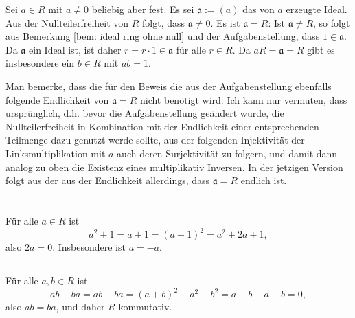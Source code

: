 \documentclass[a4paper,10pt]{article}
\theoremstyle{definition}
\newcommand{\mf}[1]{\mathfrak{#1}}
\begin{document}
Sei $a \in R$ mit $a \neq 0$ beliebig aber fest. Es sei $\mf{a} := (a)$ das von $a$ erzeugte Ideal. Aus der Nullteilerfreiheit von $R$ folgt, dass $\mf{a} \neq 0$. Es ist $\mf{a} = R$: Ist $\mf{a} \neq R$, so folgt aus Bemerkung \ref{bem: ideal ring ohne null} und der Aufgabenstellung, dass $1 \in \mf{a}$. Da $\mf{a}$ ein Ideal ist, ist daher $r = r \cdot 1 \in \mf{a}$ für alle $r \in R$. Da $aR = \mf{a} = R$ gibt es insbesondere ein $b \in R$ mit $ab = 1$.

Man bemerke, dass die für den Beweis die aus der Aufgabenstellung ebenfalls folgende Endlichkeit von $\mf{a} = R$ nicht benötigt wird: Ich kann nur vermuten, dass ursprünglich, d.h. bevor die Aufgabenstellung geändert wurde, die Nullteilerfreiheit in Kombination mit der Endlichkeit einer entsprechenden Teilmenge dazu genutzt werde sollte, aus der folgenden Injektivität der Linksmultiplikation mit $a$ auch deren Surjektivität zu folgern, und damit dann analog zu oben die Existenz eines multiplikativ Inversen. In der jetzigen Version folgt aus der aus der Endlichkeit allerdings, dass $\mf{a} = R$ endlich ist.





\section{}


\addtocounter{subsection}{1}
\subsection{}
Für alle $a \in R$ ist
\[
 a^2 + 1 = a+1 = (a+1)^2 = a^2 + 2a + 1,
\]
also $2a = 0$. Insbesondere ist $a = -a$.


\addtocounter{subsection}{-2}
\subsection{}
Für alle $a,b \in R$ ist
\[
 ab-ba = ab + ba = (a+b)^2 - a^2 - b^2 = a+b-a-b = 0,
\]
also $ab = ba$, und daher $R$ kommutativ.


\addtocounter{subsection}{1}
\end{document}
